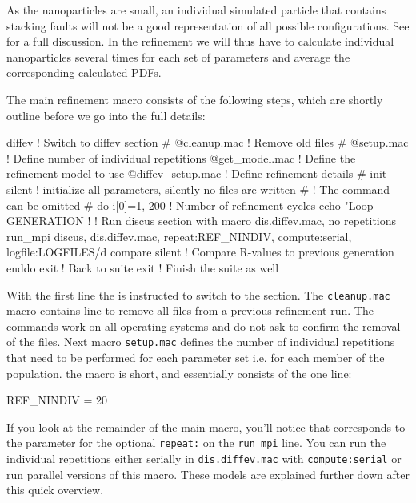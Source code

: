 As the nanoparticles are small, an individual simulated particle that 
contains stacking faults will not be a good representation of all 
possible configurations. See \cite{nedpro} for a full discussion. In the
refinement we will thus have to calculate individual nanoparticles 
several times for each set of parameters and average the corresponding 
calculated PDFs.

The main refinement macro consists of the following steps, which are shortly
outline before we go into the full details:
\begin{MacVerbatim}
diffev                        ! Switch to diffev section
#
  @cleanup.mac                ! Remove old files
#
  @setup.mac                  ! Define number of individual repetitions
  @get_model.mac              ! Define the refinement model to use
  @diffev_setup.mac           ! Define refinement details
#
  init silent                 ! initialize all parameters, silently no files are written
#                             ! The command can be omitted 
#
  do i[0]=1, 200              ! Number of refinement cycles 
    echo "Loop GENERATION %
    !                         ! Run discus section with macro dis.diffev.mac, no repetitions
    run_mpi discus, dis.diffev.mac, repeat:REF_NINDIV, compute:serial, logfile:LOGFILES/d
    compare silent            ! Compare R-values to previous generation
  enddo
exit                          ! Back to suite
exit                          ! Finish the suite as well
\end{MacVerbatim}
With the first line the \Suite is  instructed to switch to the \Diffev section. 
The {\tt cleanup.mac} macro contains line to remove all files from a previous
refinement run. The commands work on all operating systems and do not ask to
confirm the removal of the files. Next macro {\tt setup.mac} defines the number 
of individual repetitions that need to be performed for each parameter set i.e. 
for each member of the population.  the macro is short, and essentially consists
of the one line:
\begin{MacVerbatim}
REF_NINDIV = 20
\end{MacVerbatim}
If you look at the remainder of the main macro, you'll notice that 
corresponds to the parameter for the optional {\tt repeat:} on 
the {\tt run\_mpi} line.
You can run the individual repetitions either serially in {\tt dis.diffev.mac}
with {\tt compute:serial} or
run parallel versions of this macro. 
These models are explained 
further down after this quick overview. 

